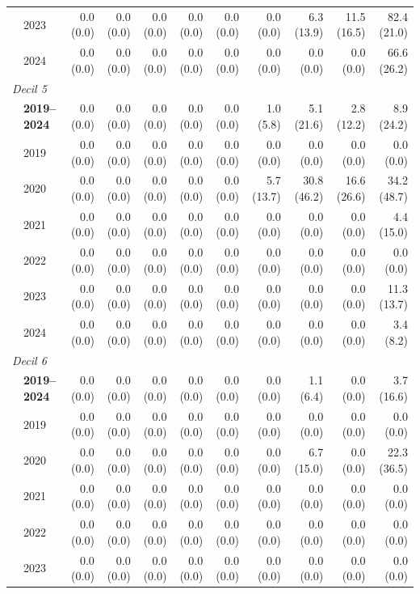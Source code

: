 \begin{table}[htbp]
\begin{tabular}{llrrrrrrrrr}
 & 2023 & 0.0 (0.0) & 0.0 (0.0) & 0.0 (0.0) & 0.0 (0.0) & 0.0 (0.0) & 0.0 (0.0) & 6.3 (13.9) & 11.5 (16.5) & 82.4 (21.0) \\
 & 2024 & 0.0 (0.0) & 0.0 (0.0) & 0.0 (0.0) & 0.0 (0.0) & 0.0 (0.0) & 0.0 (0.0) & 0.0 (0.0) & 0.0 (0.0) & 66.6 (26.2) \\
\midrule
\multicolumn{11}{l}{\textit{Decil 5}} \\
 & \textbf{2019–2024} & 0.0 (0.0) & 0.0 (0.0) & 0.0 (0.0) & 0.0 (0.0) & 0.0 (0.0) & 1.0 (5.8) & 5.1 (21.6) & 2.8 (12.2) & 8.9 (24.2) \\
 & 2019 & 0.0 (0.0) & 0.0 (0.0) & 0.0 (0.0) & 0.0 (0.0) & 0.0 (0.0) & 0.0 (0.0) & 0.0 (0.0) & 0.0 (0.0) & 0.0 (0.0) \\
 & 2020 & 0.0 (0.0) & 0.0 (0.0) & 0.0 (0.0) & 0.0 (0.0) & 0.0 (0.0) & 5.7 (13.7) & 30.8 (46.2) & 16.6 (26.6) & 34.2 (48.7) \\
 & 2021 & 0.0 (0.0) & 0.0 (0.0) & 0.0 (0.0) & 0.0 (0.0) & 0.0 (0.0) & 0.0 (0.0) & 0.0 (0.0) & 0.0 (0.0) & 4.4 (15.0) \\
 & 2022 & 0.0 (0.0) & 0.0 (0.0) & 0.0 (0.0) & 0.0 (0.0) & 0.0 (0.0) & 0.0 (0.0) & 0.0 (0.0) & 0.0 (0.0) & 0.0 (0.0) \\
 & 2023 & 0.0 (0.0) & 0.0 (0.0) & 0.0 (0.0) & 0.0 (0.0) & 0.0 (0.0) & 0.0 (0.0) & 0.0 (0.0) & 0.0 (0.0) & 11.3 (13.7) \\
 & 2024 & 0.0 (0.0) & 0.0 (0.0) & 0.0 (0.0) & 0.0 (0.0) & 0.0 (0.0) & 0.0 (0.0) & 0.0 (0.0) & 0.0 (0.0) & 3.4 (8.2) \\
\midrule
\multicolumn{11}{l}{\textit{Decil 6}} \\
 & \textbf{2019–2024} & 0.0 (0.0) & 0.0 (0.0) & 0.0 (0.0) & 0.0 (0.0) & 0.0 (0.0) & 0.0 (0.0) & 1.1 (6.4) & 0.0 (0.0) & 3.7 (16.6) \\
 & 2019 & 0.0 (0.0) & 0.0 (0.0) & 0.0 (0.0) & 0.0 (0.0) & 0.0 (0.0) & 0.0 (0.0) & 0.0 (0.0) & 0.0 (0.0) & 0.0 (0.0) \\
 & 2020 & 0.0 (0.0) & 0.0 (0.0) & 0.0 (0.0) & 0.0 (0.0) & 0.0 (0.0) & 0.0 (0.0) & 6.7 (15.0) & 0.0 (0.0) & 22.3 (36.5) \\
 & 2021 & 0.0 (0.0) & 0.0 (0.0) & 0.0 (0.0) & 0.0 (0.0) & 0.0 (0.0) & 0.0 (0.0) & 0.0 (0.0) & 0.0 (0.0) & 0.0 (0.0) \\
 & 2022 & 0.0 (0.0) & 0.0 (0.0) & 0.0 (0.0) & 0.0 (0.0) & 0.0 (0.0) & 0.0 (0.0) & 0.0 (0.0) & 0.0 (0.0) & 0.0 (0.0) \\
 & 2023 & 0.0 (0.0) & 0.0 (0.0) & 0.0 (0.0) & 0.0 (0.0) & 0.0 (0.0) & 0.0 (0.0) & 0.0 (0.0) & 0.0 (0.0) & 0.0 (0.0) \\

\end{tabular}
\end{table}
